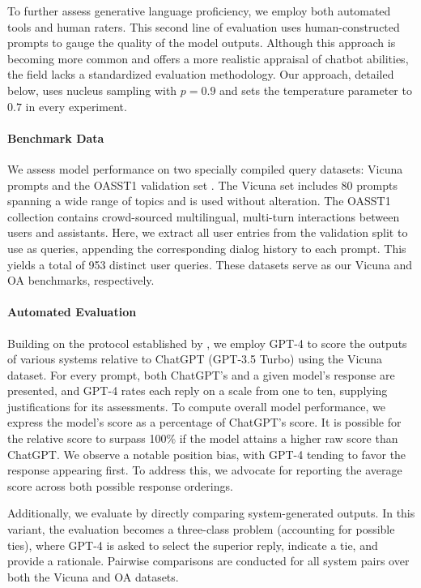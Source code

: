 To further assess generative language proficiency, we employ both automated tools and human raters. This second line of evaluation uses human-constructed prompts to gauge the quality of the model outputs. Although this approach is becoming more common and offers a more realistic appraisal of chatbot abilities, the field lacks a standardized evaluation methodology. Our approach, detailed below, uses nucleus sampling with $p=0.9$ and sets the temperature parameter to $0.7$ in every experiment.

\paragraph{Benchmark Data} We assess model performance on two specially compiled query datasets: Vicuna prompts \citep{vicuna2023} and the OASST1 validation set \citep{kopf2023openassistant}. The Vicuna set includes 80 prompts spanning a wide range of topics and is used without alteration. The OASST1 collection contains crowd-sourced multilingual, multi-turn interactions between users and assistants. Here, we extract all user entries from the validation split to use as queries, appending the corresponding dialog history to each prompt. This yields a total of 953 distinct user queries. These datasets serve as our Vicuna and OA benchmarks, respectively.

\paragraph{Automated Evaluation} Building on the protocol established by \citet{vicuna2023}, we employ GPT-4 to score the outputs of various systems relative to ChatGPT (GPT-3.5 Turbo) using the Vicuna dataset. For every prompt, both ChatGPT’s and a given model’s response are presented, and GPT-4 rates each reply on a scale from one to ten, supplying justifications for its assessments. To compute overall model performance, we express the model’s score as a percentage of ChatGPT’s score. It is possible for the relative score to surpass 100\% if the model attains a higher raw score than ChatGPT. We observe a notable position bias, with GPT-4 tending to favor the response appearing first. To address this, we advocate for reporting the average score across both possible response orderings.

Additionally, we evaluate by directly comparing system-generated outputs. In this variant, the evaluation becomes a three-class problem (accounting for possible ties), where GPT-4 is asked to select the superior reply, indicate a tie, and provide a rationale. Pairwise comparisons are conducted for all system pairs over both the Vicuna and OA datasets.

